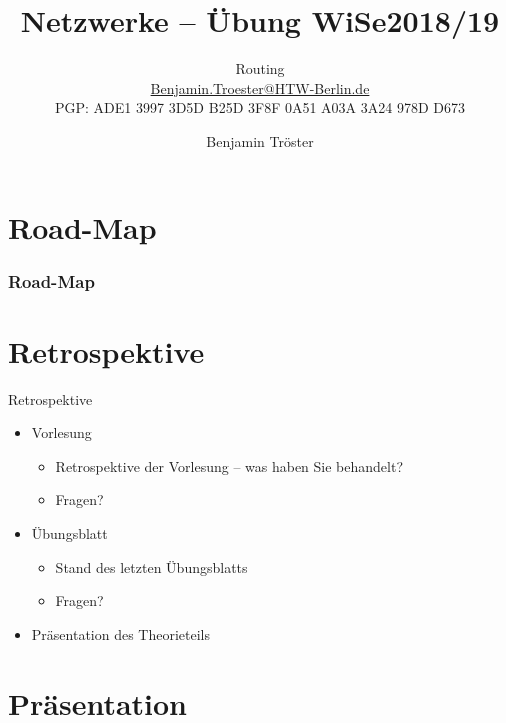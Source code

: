 \documentclass[xcolor=dvipsnames, aspectratio=169]{beamer}
\begin{document}

\title{Netzwerke -- Übung WiSe2018/19}
\subtitle{Routing\\
		\href{mailto:Benjamin.Troester@HTW-Berlin.de}{Benjamin.Troester@HTW-Berlin.de}\\
		PGP: ADE1 3997 3D5D B25D 3F8F 0A51 A03A 3A24 978D D673 }
\author{Benjamin Tröster}

\date{}

\begin{frame}
\titlepage

\end{frame}

\section*{Road-Map}
\begin{frame}
\frametitle{Road-Map}
\begin{multicols}{2}
  \tableofcontents
\end{multicols}
\end{frame}

\section{Retrospektive}
\begin{frame}{Retrospektive}
\begin{itemize}
	\item Vorlesung
	\begin{itemize}
		\item Retrospektive der Vorlesung -- was haben Sie behandelt?
		\item Fragen?
	\end{itemize}
	\item Übungsblatt
	\begin{itemize}
		\item Stand des letzten Übungsblatts
		\item Fragen?
	\end{itemize}
	\item Präsentation des Theorieteils
\end{itemize}
\end{frame}


\section{Präsentation}
\end{document}

